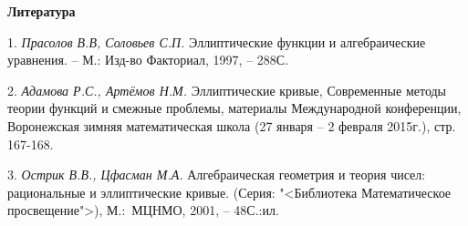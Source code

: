 \smallskip \centerline{\bf Литература}\nopagebreak

1. {\it Прасолов В.В, Соловьев С.П. } Эллиптические функции и алгебраические уравнения. -- М.: Изд-во Факториал, 1997, -- 288С.

2. {\it Адамова Р.С., Артёмов Н.М. }
Эллиптические кривые, Современные методы теории функций и смежные проблемы, материалы Международной конференции,
Во\-ро\-не\-ж\-с\-кая зимняя математическая школа (27 января -- 2 февраля 2015г.), стр. 167-168.

3. {\it Острик В.В., Цфасман М.А.   } Алгебраическая геометрия и теория чисел: рациональные и эллиптические кривые.
(Серия: "<Библиотека \glqq Математическое просвещение\grqq ">),
\linebreak
М.:~МЦНМО, 2001, -- 48С.:ил.
